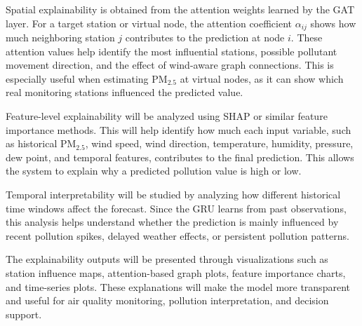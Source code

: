 Spatial explainability is obtained from the attention weights learned by the GAT layer. For a target station or virtual node, the attention coefficient $\alpha_{ij}$ shows how much neighboring station $j$ contributes to the prediction at node $i$. These attention values help identify the most influential stations, possible pollutant movement direction, and the effect of wind-aware graph connections. This is especially useful when estimating PM$_{2.5}$ at virtual nodes, as it can show which real monitoring stations influenced the predicted value.

Feature-level explainability will be analyzed using SHAP or similar feature importance methods. This will help identify how much each input variable, such as historical PM$_{2.5}$, wind speed, wind direction, temperature, humidity, pressure, dew point, and temporal features, contributes to the final prediction. This allows the system to explain why a predicted pollution value is high or low.

Temporal interpretability will be studied by analyzing how different historical time windows affect the forecast. Since the GRU learns from past observations, this analysis helps understand whether the prediction is mainly influenced by recent pollution spikes, delayed weather effects, or persistent pollution patterns.

The explainability outputs will be presented through visualizations such as station influence maps, attention-based graph plots, feature importance charts, and time-series plots. These explanations will make the model more transparent and useful for air quality monitoring, pollution interpretation, and decision support.

